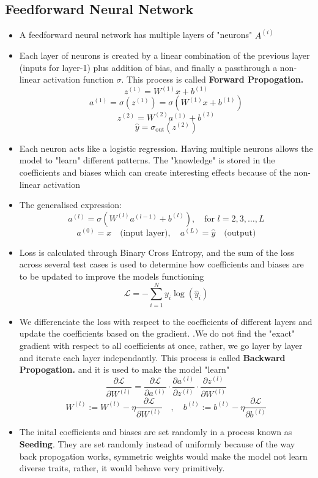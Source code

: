 \documentclass[12pt,a4paper]{article}
\begin{document}
\subsection{Feedforward Neural Network}
\begin{itemize}
\item A feedforward neural network has multiple layers of "neurons" $A^{(i)}$
\item Each layer of neurons is created by a linear combination of the previous layer (inputs for layer-1) plus addition of bias, and finally a passthrough a non-linear activation function $ \sigma$. This process is called \textbf{Forward Propogation.}
\[ z^{(1)} = W^{(1)}x + b^{(1)} \]
\[ a^{(1)} = \sigma(z^{(1)}) = \sigma(W^{(1)}x + b^{(1)}) \]
\[ z^{(2)} = W^{(2)}a^{(1)} + b^{(2)} \]
\[ \hat{y} = \sigma_{\text{out}}(z^{(2)}) \]
\item Each neuron acts like a logistic regression. Having multiple neurons allows the model to "learn" different patterns. The "knowledge" is stored in the coefficients and biases which can create interesting effects because of the non-linear activation
\item The generalised expression:
\[ a^{(l)} = \sigma(W^{(l)}a^{(l-1)} + b^{(l)}), \quad \text{for } l = 2, 3, \dots, L \]
\[ a^{(0)} = x \quad \text{(input layer)}, \quad a^{(L)} = \hat{y} \quad \text{(output)} \]
\item Loss is calculated through Binary Cross Entropy, and the sum of the loss across several test cases is used to determine how coefficients and biases are to be updated to improve the models functioning
\[ \mathcal{L} = -\sum_{i=1}^{N} y_i \log(\hat{y}_i) \]
\item We differenciate the loss with respect to the coefficients of different layers and update the coefficients based on the gradient. .We do not find the "exact" gradient with respect to all coefficients at once, rather,  we go layer by layer and iterate each layer independantly. This process is called \textbf{Backward Propogation.} and it is used to make the model "learn"
\[ \frac{\partial \mathcal{L}}{\partial W^{(l)}} = \frac{\partial \mathcal{L}}{\partial a^{(l)}} \cdot \frac{\partial a^{(l)}}{\partial z^{(l)}} \cdot \frac{\partial z^{(l)}}{\partial W^{(l)}} \]
\[ W^{(l)} := W^{(l)} - \eta \frac{\partial \mathcal{L}}{\partial W^{(l)}} \quad,\quad b^{(l)} := b^{(l)} - \eta \frac{\partial \mathcal{L}}{\partial b^{(l)}} \]
\item The inital coefficients and biases are set randomly in a process known as \textbf{Seeding}. They are set randomly instead of uniformly because of the way back propogation works, symmetric weights would make the model not learn diverse traits, rather, it would behave very primitively. 
\end{itemize}
\end{document}

